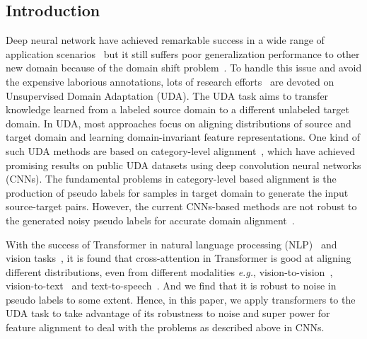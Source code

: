\documentclass[dvipsnames, svgnames, x11names, table]{article} \usepackage{iclr2022_conference,times}
\begin{document}
\begin{spacing}{1.0}
\section{Introduction}
Deep neural network have achieved remarkable success in a wide range of application scenarios~\citep{wang2022adanets,qian2021learning,jiang2022giraffedet,tan2019lrt,chen2021tagperson,jiang2021exploring,chen2017beyond} but it still suffers poor generalization performance to other new domain because of the domain shift problem~\citep{csurka2017domain,zhao2020review,zhang2020unsupervised,oza2021unsupervised}.
To handle this issue and avoid the expensive laborious annotations, lots of research efforts~\citep{bousmalis2017unsupervised,kuroki2019unsupervised,wilson2020survey,vs2021mega} are devoted on Unsupervised Domain Adaptation (UDA). The UDA task aims to transfer knowledge learned from a labeled source domain to a different unlabeled target domain. In UDA, most approaches focus on aligning distributions of source and target domain and learning domain-invariant feature representations. One kind of such UDA methods are based on category-level alignment~\citep{kang2019contrastive,zhang2019category,jiang2020implicit,li2021category}, which have achieved promising results on public UDA datasets using deep convolution neural networks (CNNs). The fundamental problems in category-level based alignment is the production of pseudo labels for samples in target domain to generate the input source-target pairs. However, the current CNNs-based methods are not robust to the generated noisy pseudo labels for accurate domain alignment~\citep{morerio2020generative,jiang2020implicit}. 






With the success of Transformer in natural language processing (NLP)~\citep{vaswani2017attention,devlin2018bert} and vision tasks~\citep{dosovitskiy2020image,han2020survey,he2021transreid,khan2021transformers}, it is found that cross-attention in Transformer is good at aligning different distributions, even from different modalities \textit{e.g.}, vision-to-vision~\citep{li2021trear}, vision-to-text~\citep{tsai2019multimodal,hu2021unit} and text-to-speech~\citep{li2019neural}. And we find that it is robust to noise in pseudo labels to some extent. Hence, in this paper, we apply transformers to the UDA task to take advantage of its robustness to noise and super power for feature alignment to deal with the problems as described above in CNNs.









\end{spacing}
\end{document}
